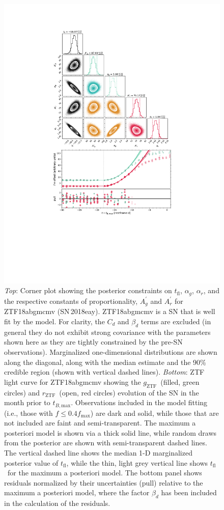 \documentclass[twocolumn]{aastex63}
\newcommand{\rztf}{$r_\mathrm{ZTF}$}
\newcommand{\gztf}{$g_\mathrm{ZTF}$}
\newcommand{\tfl}{$t_\mathrm{fl}$}
\newcommand{\tbmax}{$t_{B,\mathrm{max}}$}
\begin{document}
\begin{figure}
    \centering
    \includegraphics[width=5.2in]{./figures/Fig1.pdf}
    \caption{\textit{Top}: Corner plot showing the posterior constraints on
    \tfl, $\alpha_g$, $\alpha_r$, and the respective constants of
    proportionality, $A_g^\prime$ and $A_r^\prime$ for ZTF18abgmcmv
    (SN\,2018eay). ZTF18abgmcmv is a SN that is well fit by the model. For
    clarity, the $C_d$ and $\beta_d$ terms are excluded (in general they do
    not exhibit strong covariance with the parameters shown here as they are
    tightly constrained by the pre-SN observations). Marginalized
    one-dimensional distributions are shown along the diagonal, along with the
    median estimate and the 90\% credible region (shown with vertical dashed
    lines). \textit{Bottom}: ZTF light curve for ZTF18abgmcmv showing the
    \gztf\ (filled, green circles) and \rztf\ (open, red circles) evolution of
    the SN in the month prior to \tbmax. Observations included in the model
    fitting (i.e., those with $f \le 0.4 f_\mathrm{max}$) are dark and solid,
    while those that are not included are faint and semi-transparent. The
    maximum a posteriori model is shown via a thick solid line, while random
    draws from the posterior are shown with semi-transparent dashed lines. The
    vertical dashed line shows the median 1-D marginalized posterior value of
    \tfl, while the thin, light grey vertical line shows \tfl\ for the maximum
    a posteriori model. The bottom panel shows residuals normalized by their
    uncertainties (pull) relative to the maximum a posteriori model, where the
    factor $\beta_d$ has been included in the calculation of the residuals.}
    \label{fig:corner_good}
\end{figure}
\end{document}

